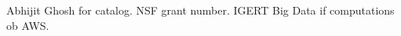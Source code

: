 \documentclass[draft]{agujournal2019}
\begin{document}
%
%
%
%
%
%
%
%


\acknowledgments
Abhijit Ghosh for catalog. NSF grant number. IGERT Big Data if computations ob AWS.



%
%





%
%
%
%
%
\end{document}
